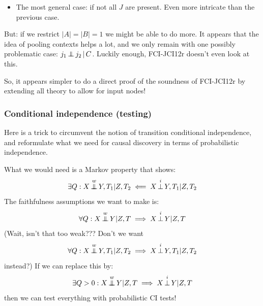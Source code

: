 \begin{itemize}
    indeed, the $\Prb(X_{J\sm C}|X_{C\cap J})$ becomes the surrogate exogenous distribution on $X_{J\sm C}$, the $X_{C\cap J}$ become `constants'. This means that for every conditioning set $C\cap J$ leads us to a different surrogate graphical representation of the exogenous distribution. This is what I had in mind a long time ago when I wanted to derive a `graphical' representation for an arbitrary CI model on the inputs and a CDMG CI model for the output given the input. 
    The fourth term seems a bit tricky: conditioning on output colliders might lead to additional dependences between input nodes; but only ``might''. Hm, we get into the intricacies of JCI-3 like faithfulness assumptions.
  \item The most general case: if not all $J$ are present. Even more intricate than the previous case.
\end{itemize}
But: if we restrict $|A|=|B|=1$ we might be able to do more. It appears that the idea of pooling contexts helps a lot, and we only remain with one possibly problematic case: $j_1 \operatorname*{\perp\mkern-11mu\perp} j_2 \operatorname*{|} C$. Luckily enough, FCI-JCI12r doesn't even look at this.

So, it appears simpler to do a direct proof of the soundness of FCI-JCI12r by extending all theory to allow for input nodes!


\subsubsection{Conditional independence (testing)}

Here is a trick to circumvent the notion of transition conditional independence, and reformulate what we need for causal
discovery in terms of probabilistic independence.

What we would need is a Markov property that shows:
$$\exists Q : X \operatorname*{\perp\mkern-11mu\perp}^w Y,T_1 | Z,T_2 \impliedby X \operatorname*{\perp}^i Y,T_1 | Z,T_2$$
The faithfulness assumptions we want to make is:
$$\forall Q : X \operatorname*{\perp\mkern-11mu\perp}^w Y | Z,T \implies X \operatorname*{\perp}^i Y | Z,T$$
(Wait, isn't that too weak??? Don't we want
$$\forall Q : X \operatorname*{\perp\mkern-11mu\perp}^w Y,T_1 | Z,T_2 \implies X \operatorname*{\perp}^i Y,T_1 | Z,T_2$$
instead?)
If we can replace this by:
$$\exists Q > 0 : X \operatorname*{\perp\mkern-11mu\perp}^w Y | Z,T \implies X \operatorname*{\perp}^i Y | Z,T$$
then we can test everything with probabilistic CI tests!

